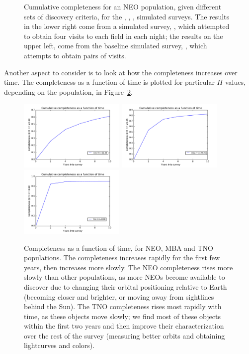 \begin{figure}
\caption{Cumulative completeness for an NEO population, given
  different sets of discovery criteria, for the , ,
,
 simulated surveys. The results in the
lower right come from a simulated survey, ,
which attempted to obtain four visits to each field in each
night; the results on the upper left, come from the baseline simulated
survey, , which attempts to obtain pairs of
visits.
\label{completeness_changes}}
\end{figure}

Another aspect to consider is to look at how the completeness
increases over time. The completeness as a function of time is plotted
for particular $H$ values, depending on the
population, in Figure~\ref{completeness_time}. 

\begin{figure}
\includegraphics[width=2in]{figs/solarsystem/minion_1016_neo_CompletenessOverTime_22_time}
\includegraphics[width=2in]{figs/solarsystem/minion_1016_mba_CompletenessOverTime_20_time}
\includegraphics[width=2in]{figs/solarsystem/minion_1016_tno_CompletenessOverTime_8_time}
\caption{Completeness as a function of time, for NEO, MBA and TNO
  populations. The completeness increases rapidly for the first few
  years, then increases more slowly. The NEO completeness rises more
  slowly than other populations, as more NEOs become available to
  discover due to changing their orbital positioning relative to Earth
  (becoming closer and brighter, or moving away from sightlines behind
  the Sun). The TNO completeness rises most rapidly with time, as
  these objects move slowly; we find most of these objects within the
  first two years and then improve their characterization over the
  rest of the survey (measuring better orbits and obtaining
  lightcurves and colors).
\label{completeness_time}}
\end{figure}


